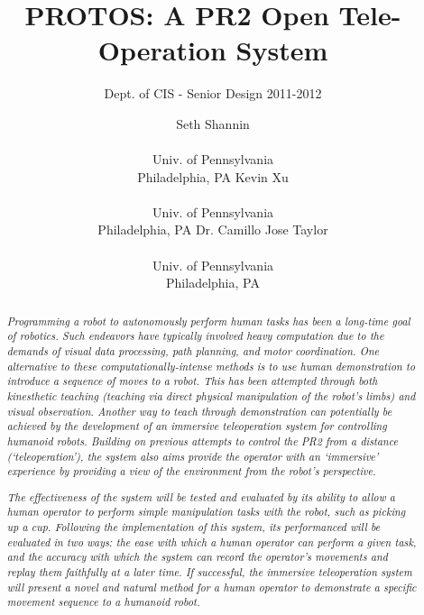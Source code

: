 \documentclass{sig-alternate}
\begin{document}
 

\title{PROTOS: A PR2 Open Tele-Operation System}

\subtitle{Dept. of CIS - Senior Design 2011-2012}
\author{
\alignauthor Seth Shannin \\  \\ Univ. of Pennsylvania \\ Philadelphia, PA
\alignauthor Kevin Xu \\  \\ Univ. of Pennsylvania \\ Philadelphia, PA
\alignauthor Dr. Camillo Jose Taylor \\  \\ Univ. of Pennsylvania \\ Philadelphia, PA}
\date{}
\maketitle

\begin{abstract}
\textit{\indent Programming a robot to autonomously perform human tasks has been a 
long-time goal of robotics. Such endeavors have typically involved heavy 
computation due to the demands of visual data processing, path planning, and motor 
coordination. One alternative to these computationally-intense methods is to use 
human demonstration to introduce a sequence 
of moves to a robot. This has been attempted
through both kinesthetic teaching (teaching via direct physical 
manipulation of the robot's limbs) and visual observation. Another way to teach through demonstration
can potentially be achieved by the development of an immersive
teleoperation system for controlling humanoid robots. Building on previous attempts to
control the PR2 from a distance (`teleoperation'), the system also aims provide the
operator with an `immersive' experience by providing a view of 
the environment from the robot's perspective.}

\textit{\indent The effectiveness of the system will be tested and evaluated by its ability to allow a human operator
to perform simple manipulation tasks with the robot, such as picking up a cup.
Following the implementation of this system, its performanced will be evaluated in two ways: the ease with which
a human operator can perform a given task, and the accuracy with which the system can record
the operator's movements and replay them faithfully at a later time.
If successful, the immersive teleoperation system will present a novel and natural method for a
human operator to demonstrate a specific movement sequence to a humanoid robot.}
\end{abstract}
\end{document}
